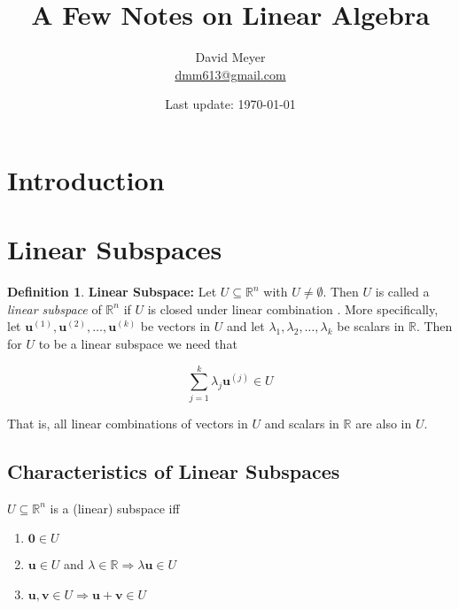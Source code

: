 \documentclass{article}
\title{A Few Notes on Linear Algebra}
\author{David Meyer \\ \href{mailto:dmm613@gmail.com}
                            {dmm613@gmail.com}}
\date{Last update: \today}
\theoremstyle{definition}
\newtheorem{definition}{Definition}[section]
\begin{document}
\maketitle
%
%
%
\section{Introduction}
\label{sec:introduction}
%
%
%
\section{Linear Subspaces}
\label{sec:linear_subspaces}

\begin{definition} {\bf Linear Subspace:} Let $U \subseteq
\mathbb{R}^{n}$ with $U \neq \emptyset$.  Then $U$ is called a
\emph{linear subspace} of $\mathbb{R}^{n}$ if $U$ is closed under
linear combination \cite{wiki:linear_subspace}. More specifically, 
let $\mathbf{u}^{(1)},\mathbf{u}^{(2)},\hdots, \mathbf{u}^{(k)}$ be 
vectors in $U$ and let $\lambda_{1},\lambda_{2},\hdots, \lambda_{k}$ 
be scalars in $\mathbb{R}$. Then for $U$ to be a linear subspace we 
need that

\begin{equation*}
\sum\limits_{j=1}^{k} \lambda_{j} \mathbf{u}^{(j)} \in U
\label{eqn:linear_subspace}
\end{equation*}

\medskip
\noindent
That is, all linear combinations of vectors in $U$ and scalars in
$\mathbb{R}$ are also in $U$.
\end{definition}


\subsection{Characteristics of Linear Subspaces}
$U \subseteq \mathbb{R}^{n}$ is a (linear) subspace iff

\begin{enumerate}[label=(\alph*)]
\item $\mathbf{0} \in U$ 
\item $\mathbf{u} \in U$ and $\lambda \in \mathbb{R} 
	   \Rightarrow \lambda \mathbf{u} \in U$ 
\item $\mathbf{u}, \mathbf{v} \in U \Rightarrow 
       \mathbf{u}+\mathbf{v} \in U$
\end{enumerate}
\end{document}
